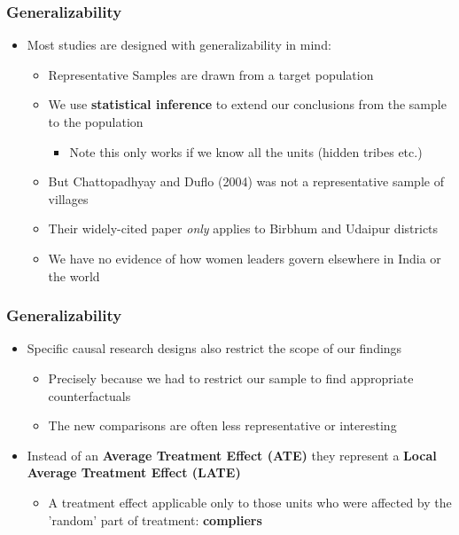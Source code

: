 \documentclass[xcolor=x11names,compress]{beamer}\usepackage[]{graphicx}\usepackage[]{xcolor}
\renewcommand{\(}{\begin{columns}}
\renewcommand{\)}{\end{columns}}
\newcommand{\<}[1]{\begin{column}{#1}}
\renewcommand{\>}{\end{column}}
\begin{document}
\begin{frame}
\frametitle{Generalizability}
\begin{itemize}
\item Most studies are designed with generalizability in mind:
\pause
\begin{itemize}
\item Representative Samples are drawn from a target population
\pause
\item We use \textbf{statistical inference} to extend our conclusions from the sample to the population
\pause
\begin{itemize}
\item Note this only works if we know all the units (hidden tribes etc.)
\pause
\end{itemize}
\item But Chattopadhyay and Duflo (2004) was not a representative sample of villages
\pause
\item Their widely-cited paper \textit{only} applies to Birbhum and Udaipur districts
\pause
\item We have no evidence of how women leaders govern elsewhere in India or the world
\end{itemize}
\end{itemize}
\end{frame}

\begin{frame}
\frametitle{Generalizability}
\begin{itemize}
\item Specific causal research designs also restrict the scope of our findings
\pause
\begin{itemize}
\item Precisely because we had to restrict our sample to find appropriate counterfactuals
\pause
\item The new comparisons are often less representative or interesting
\pause
\end{itemize}
\item Instead of an \textbf{Average Treatment Effect (ATE)} they represent a \textbf{Local Average Treatment Effect (LATE)}
\pause
\begin{itemize}
\item A treatment effect applicable only to those units who were affected by the 'random' part of treatment: \textbf{compliers}
\end{itemize}
\end{itemize}
\end{frame}
\end{document}
